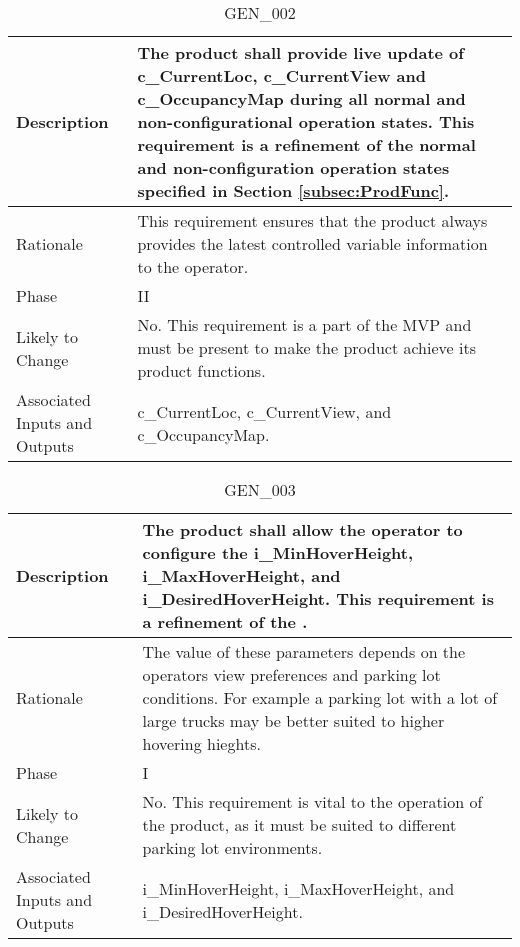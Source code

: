 \documentclass{article}
\begin{document}
\begin{table}[!h]
\begin{center}
\caption {GEN\_002} 
\label{GEN_002}
\begin{tabular}{ | m{3cm} | m{11cm} | }
\hline
Description & The product shall provide live update of c\_CurrentLoc, c\_CurrentView and c\_OccupancyMap during all normal and non-configurational operation states. This requirement is a refinement of the normal and non-configuration operation states specified in Section \ref{subsec:ProdFunc}. \\
\hline
Rationale & This requirement ensures that the product always provides the latest controlled variable information to the operator. \\
\hline
Phase & II \\
\hline
Likely to Change & No. This requirement is a part of the MVP and must be present to make the product achieve its product functions. \\
\hline
Associated Inputs and Outputs & c\_CurrentLoc, c\_CurrentView, and c\_OccupancyMap. \\
\hline
\end{tabular}
\end{center}
\end{table}

\begin{table}[!h]
\begin{center}
\caption {GEN\_003} 
\label{GEN_003}
\begin{tabular}{ | m{3cm} | m{11cm} | }
\hline
Description & The product shall allow the operator to configure the i\_MinHoverHeight, i\_MaxHoverHeight, and i\_DesiredHoverHeight. This requirement is a refinement of the \nameref{Configure State}. \\
\hline
Rationale & The value of these parameters depends on the operators view preferences and parking lot conditions. For example a parking lot with a lot of large trucks may be better suited to higher hovering hieghts. \\
\hline
Phase & I \\
\hline
Likely to Change & No. This requirement is vital to the operation of the product, as it must be suited to different parking lot environments. \\
\hline
Associated Inputs and Outputs & i\_MinHoverHeight, i\_MaxHoverHeight, and i\_DesiredHoverHeight. \\
\hline
\end{tabular}
\end{center}
\end{table}
\end{document}

